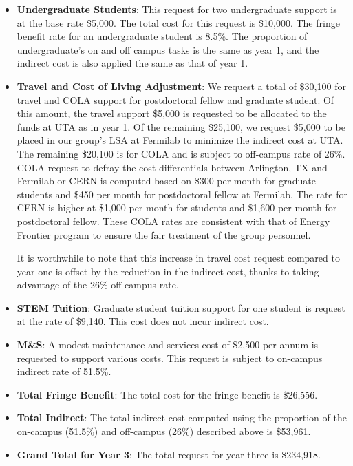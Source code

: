 \begin{enumerate}
\begin{itemize}[noitemsep,nolistsep]
\item {{\bf Undergraduate Students}: This request for two undergraduate support is at the base rate \$5,000.  The total cost for this request is \$10,000.  The fringe benefit rate for an undergraduate student is 8.5\%.  The proportion of undergraduate’s on and off campus tasks is the same as year 1, and the indirect cost is also applied the same as that of year 1.}

\item{{\bf Travel and Cost of Living Adjustment}: We request a total of \$30,100 for travel and COLA support for postdoctoral fellow and graduate student.   Of this amount, the travel support \$5,000 is requested to be allocated to the funds at UTA as in year 1.  Of the remaining \$25,100, we request \$5,000 to be placed in our group’s LSA at Fermilab to minimize the indirect cost at UTA.   The remaining \$20,100 is for COLA and is subject to off-campus rate of 26\%.  COLA request to defray the cost differentials between Arlington, TX and Fermilab or CERN is computed based on \$300 per month for graduate students and \$450 per month for postdoctoral fellow at Fermilab.  The rate for CERN is higher at \$1,000 per month for students and \$1,600 per month for postdoctoral fellow.  These COLA rates are consistent with that of Energy Frontier program to ensure the fair treatment of the group personnel.  

It is worthwhile to note that this increase in travel cost request compared to year one is offset by the reduction in the indirect cost, thanks to taking advantage of the 26\% off-campus rate.}

\item {{\bf STEM Tuition}: Graduate student tuition support for one student is request at the rate of \$9,140.  This cost does not incur indirect cost.}

\item {{\bf M\&S}: A modest maintenance and services cost of \$2,500 per annum is requested to support various costs.   This request is subject to on-campus indirect rate of 51.5\%.}

\item {{\bf Total Fringe Benefit}: The total cost for the fringe benefit is \$26,556.}
\item {{\bf Total Indirect}: The total indirect cost computed using the proportion of the on-campus (51.5\%) and off-campus (26\%) described above is \$53,961.}
\item {{\bf Grand Total for Year 3}: The total request for year three is \$234,918.}

\end{itemize}
\end{enumerate}
